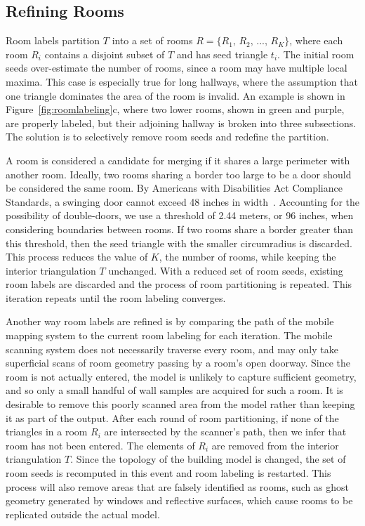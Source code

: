 \documentclass[a4paper,twoside]{article}
\begin{document}
\subsection{Refining Rooms}
\label{sec:refiningrooms}

Room labels partition $T$ into a set of rooms $R = \{R_1,\,R_2,\,...,\,R_K\}$, where each room $R_i$ contains a disjoint subset of $T$ and has seed triangle $t_i$.  The initial room seeds over-estimate the number of rooms, since a room may have multiple local maxima.  This case is especially true for long hallways, where the assumption that one triangle dominates the area of the room is invalid.  An example is shown in Figure~\ref{fig:roomlabeling}c, where two lower rooms, shown in green and purple, are properly labeled, but their adjoining hallway is broken into three subsections.  The solution is to selectively remove room seeds and redefine the partition.

A room is considered a candidate for merging if it shares a large perimeter with another room.  Ideally, two rooms sharing a border too large to be a door should be considered the same room.  By Americans with Disabilities Act Compliance Standards, a swinging door cannot exceed 48 inches in width~\cite{ADACompliance}.  Accounting for the possibility of double-doors, we use a threshold of 2.44 meters, or 96 inches, when considering boundaries between rooms.  If two rooms share a border greater than this threshold, then the seed triangle with the smaller circumradius is discarded.  This process reduces the value of $K$, the number of rooms, while keeping the interior triangulation $T$ unchanged.  With a reduced set of room seeds, existing room labels are discarded and the process of room partitioning is repeated.  This iteration repeats until the room labeling converges.

Another way room labels are refined is by comparing the path of the mobile mapping system to the current room labeling for each iteration.  The mobile scanning system does not necessarily traverse every room, and may only take superficial scans of room geometry passing by a room's open doorway.  Since the room is not actually entered, the model is unlikely to capture sufficient geometry, and so only a small handful of wall samples are acquired for such a room.  It is desirable to remove this poorly scanned area from the model rather than keeping it as part of the output.  After each round of room partitioning, if none of the triangles in a room $R_i$ are intersected by the scanner's path, then we infer that room has not been entered.  The elements of $R_i$ are removed from the interior triangulation $T$.  Since the topology of the building model is changed, the set of room seeds is recomputed in this event and room labeling is restarted.  This process will also remove areas that are falsely identified as rooms, such as ghost geometry generated by windows and reflective surfaces, which cause rooms to be replicated outside the actual model.
\end{document}
